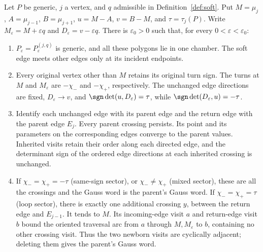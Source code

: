 \begin{lemma}\label{lem:soft-generic}\leanok
Let $P$ be generic, $j$ a vertex, and $q$ admissible in
Definition~\ref{def:soft}. Put $M=\mu_j$, $A=\mu_{j-1}$,
$B=\mu_{j+1}$, $u=M-A$, $v=B-M$, and $\tau=\tau_j(P)$.
Write $M_\varepsilon=M+\varepsilon q$ and
$D_\varepsilon=v-\varepsilon q$. There is $\varepsilon_0>0$
such that, for every $0<\varepsilon<\varepsilon_0$:
\begin{enumerate}
\item[(i)] $P_\varepsilon=P^{(j,q)}_\varepsilon$ is generic,
and all these polygons lie in one chamber. The soft edge meets
other edges only at its incident endpoints.
\item[(ii)] Every original vertex other than $M$ retains its
original turn sign. The turns at $M$ and $M_\varepsilon$ are
$-\chi_-$ and $-\chi_+$, respectively. The unchanged edge
 directions are fixed, $D_\varepsilon\to v$, and
$\sgn\det(u,D_\varepsilon)=\tau$, while
$\sgn\det(D_\varepsilon,u)=-\tau$.
\item[(iii)] Identify each unchanged edge with its parent edge
and the return edge with the parent edge $E_j$. Every parent
crossing persists. Its point and its parameters on the corresponding
edges converge to the parent values. Inherited visits retain their
order along each directed edge, and the determinant sign of the
ordered edge directions at each inherited crossing is unchanged.
\item[(iv)] If $\chi_-=\chi_+=-\tau$ (same-sign sector), or
$\chi_-\ne\chi_+$ (mixed sector), these are all the crossings
and the Gauss word is the parent's Gauss word. If
$\chi_-=\chi_+=\tau$ (loop sector), there is exactly one
additional crossing $y$, between the return edge and $E_{j-1}$.
It tends to $M$. Its incoming-edge visit $a$ and return-edge
visit $b$ bound the oriented traversal arc from $a$ through
$M,M_\varepsilon$ to $b$, containing no other crossing visit.
Thus the two newborn visits are cyclically adjacent; deleting
 them gives the parent's Gauss word.
\end{enumerate}

\end{lemma}

